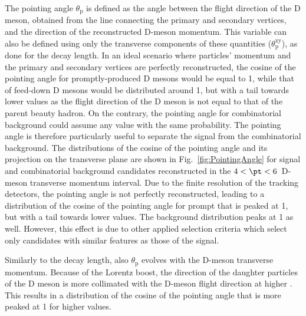 The pointing angle $\theta_\mathrm{p}$ is defined as the angle between the flight direction of the D meson, obtained from the line connecting the primary and secondary vertices, and the direction of the reconstructed D-meson momentum. This variable can also be defined using only the transverse components of these quantities ($\theta_\mathrm{p}^{\mathrm{xy}}$), as done for the decay length. In an ideal scenario where particles' momentum and the primary and secondary vertices are perfectly reconstructed, the cosine of the pointing angle for promptly-produced D mesons would be equal to 1, while that of feed-down D mesons would be distributed around 1, but with a tail towards lower values as the flight direction of the D meson is not equal to that of the parent beauty hadron. On the contrary, the pointing angle for combinatorial background could assume any value with the same probability. The pointing angle is therefore particularly useful to separate the signal from the combinatorial background. The distributions of the cosine of the pointing angle and its projection on the transverse plane are shown in Fig.~\ref{fig:PointingAngle} for signal and combinatorial background candidates reconstructed in the $4 < \pt < 6$~\gevc D-meson transverse momentum interval. Due to the finite resolution of the tracking detectors, the pointing angle is not perfectly reconstructed, leading to a distribution of the cosine of the pointing angle for prompt \ds that is peaked at 1, but with a tail towards lower values. The background distribution peaks at 1 as well. However, this effect is due to other applied selection criteria which select only candidates with similar features as those of the signal. 

Similarly to the decay length, also $\theta_\mathrm{p}$ evolves with the D-meson transverse momentum. Because of the Lorentz boost, the direction of the daughter particles of the D meson is more collimated with the D-meson flight direction at higher \pt. This results in a distribution of the cosine of the pointing angle that is more peaked at 1 for higher \pt values.

